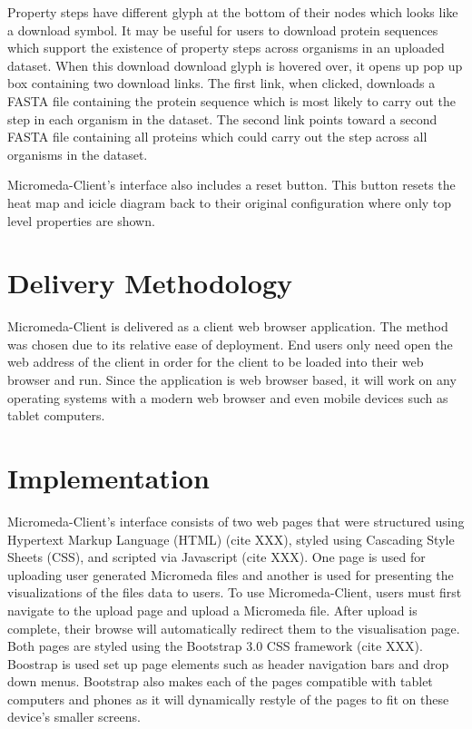Property steps have different glyph at the bottom of their nodes which looks like a download symbol. It may be useful for users to download protein sequences which support the existence of property steps across organisms in an uploaded dataset. When this download download glyph is hovered over, it opens up pop up box containing two download links. The first link, when clicked, downloads a FASTA file containing the protein sequence which is most likely to carry out the step in each organism in the dataset. The second link points toward a second FASTA file containing all proteins which could carry out the step across all organisms in the dataset.

Micromeda-Client's interface also includes a reset button. This button resets the heat map and icicle diagram back to their original configuration where only top level properties are shown.

\section{Delivery Methodology}

Micromeda-Client is delivered as a client web browser application. The method was chosen due to its relative ease of deployment. End users only need open the web address of the client in order for the client to be loaded into their web browser and run. Since the application is web browser based, it will work on any operating systems with a modern web browser and even mobile devices such as tablet computers.

\section{Implementation}

Micromeda-Client's interface consists of two web pages that were structured using Hypertext Markup Language (HTML) (cite XXX), styled using Cascading Style Sheets (CSS), and scripted via Javascript (cite XXX). One page is used for uploading user generated Micromeda files and another is used for presenting the visualizations of the files data to users. To use Micromeda-Client, users must first navigate to the upload page and upload a Micromeda file. After upload is complete, their browse will automatically redirect them to the visualisation page. Both pages are styled using the Bootstrap 3.0 CSS framework (cite XXX). Boostrap is used set up page elements such as header navigation bars and drop down menus. Bootstrap also makes each of the pages compatible with tablet computers and phones as it will dynamically restyle of the pages to fit on these device's smaller screens.

